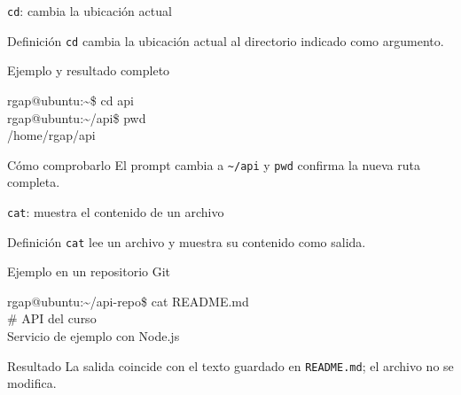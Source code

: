 \documentclass[aspectratio=169,10pt,c]{beamer}
\begin{document}
\begin{frame}{\texttt{cd}: cambia la ubicación actual}
\begin{block}{Definición}
\large \texttt{cd} cambia la ubicación actual al directorio indicado como argumento.
\end{block}
\begin{exampleblock}{Ejemplo y resultado completo}
\begin{terminal}
rgap@ubuntu:\textasciitilde\$ cd api\\
rgap@ubuntu:\textasciitilde/api\$ pwd\\
/home/rgap/api
\end{terminal}
\end{exampleblock}
\begin{alertblock}{Cómo comprobarlo}
\small El prompt cambia a \texttt{\textasciitilde/api} y \texttt{pwd} confirma la nueva ruta completa.
\end{alertblock}
\end{frame}

\begin{frame}{\texttt{cat}: muestra el contenido de un archivo}
\begin{block}{Definición}
\large \texttt{cat} lee un archivo y muestra su contenido como salida.
\end{block}
\begin{exampleblock}{Ejemplo en un repositorio Git}
\begin{terminal}
rgap@ubuntu:\textasciitilde/api-repo\$ cat README.md\\
\# API del curso\\
Servicio de ejemplo con Node.js
\end{terminal}
\end{exampleblock}
\begin{alertblock}{Resultado}
\small La salida coincide con el texto guardado en \texttt{README.md}; el archivo no se modifica.
\end{alertblock}
\end{frame}
\end{document}

